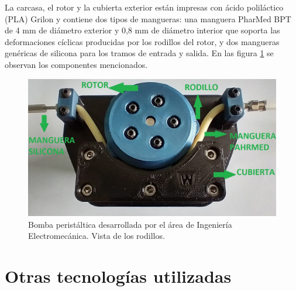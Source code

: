 La carcasa, el rotor y la cubierta exterior están impresas con ácido poliláctico (PLA) Grilon y contiene dos tipos de mangueras: una manguera PharMed BPT de 4 mm de diámetro exterior y 0,8 mm de diámetro interior que soporta las deformaciones cíclicas producidas por los rodillos del rotor, y dos mangueras genéricas de silicona para los tramos de entrada y salida. En las figura \ref{fig:bombaFrente} se observan los componentes mencionados.

\begin{figure}[htbp]
	\centering
	\includegraphics[width=.6\textwidth]{./Figures/bombaFrente.jpg}
	\caption{Bomba peristáltica desarrollada por el área de Ingeniería Electromecánica. Vista de los rodillos.}
	\label{fig:bombaFrente}
\end{figure}





\section{Otras tecnologías utilizadas}

